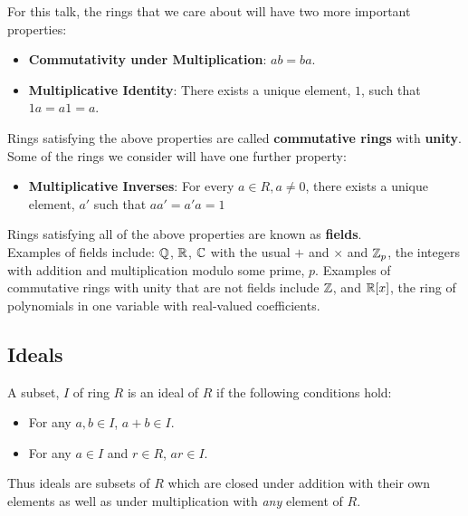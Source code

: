 \documentclass[twoside]{report}
\begin{document}
\bigskip For this talk, the rings that we care about will have two
more important properties:

\begin{itemize}
\item \textbf{Commutativity under Multiplication}: $ab = ba$.
\item \textbf{Multiplicative Identity}: There exists a unique
  element, $1$, such that $1a = a1 = a$.
\end{itemize}

Rings satisfying the above properties are called \textbf{commutative
  rings} with \textbf{unity}.\\

Some of the rings we consider will have one further property:

\begin{itemize}
\item \textbf{Multiplicative Inverses}: For every $a \in R, a \neq 0$, there
  exists a unique element, $a'$ such that $aa' = a'a = 1$
\end{itemize}

Rings satisfying all of the above properties are known as
\textbf{fields}.\\

Examples of fields include: $\mathbb{Q}$, $\mathbb{R}$, $\mathbb{C}$ with
the usual $+$ and $\times$ and $\mathbb{Z}_p$, the integers with
addition and multiplication modulo some prime, $p$. Examples of
commutative rings with unity that are not fields include $\mathbb{Z}$,
and $\mathbb{R}[x]$, the ring of polynomials in one variable with
real-valued coefficients.

\subsection{Ideals}

A subset, $I$ of ring $R$ is an ideal of $R$ if the following conditions hold:

\begin{itemize}
\item For any $a, b \in I$, $a + b \in I$.
\item For any $a \in I$ and $r \in R$, $ar \in I$.
\end{itemize}

Thus ideals are subsets of $R$ which are closed under addition with
their own elements as well as under multiplication with \textit{any}
element of $R$.\\
\end{document}
